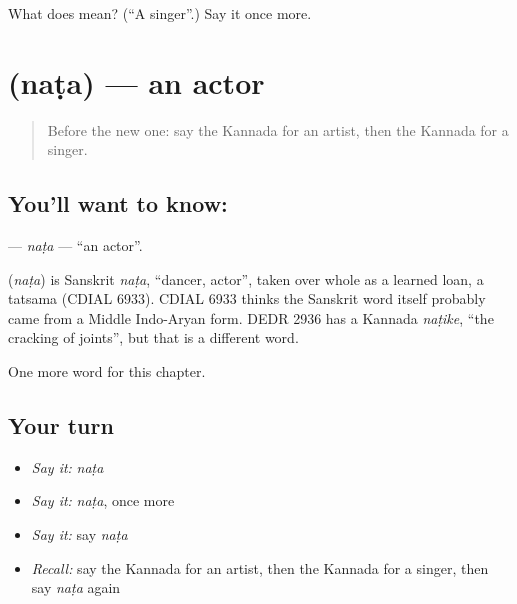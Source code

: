\begin{tcolorbox}[breakable,colback=teal!4,colframe=teal!35!black,title={Before you move on}]
What does  mean? (\textquotedblleft{}A singer\textquotedblright{}.) Say it once more.
\end{tcolorbox}
\section[\texorpdfstring{\kn{ನಟ} (naṭa)}{ನಟ (naṭa)}]{ (naṭa) — an actor}

\label{lesson:KA-C305-nata}



\begin{quote}
Before the new one: say the Kannada for an artist, then the Kannada for a singer.
\end{quote}

\subsection*{You'll want to know: }
\textbf{} — \emph{naṭa} — \textquotedblleft{}an actor\textquotedblright{}.

\begin{cousinweb}
\textbf{} (\emph{naṭa}) is Sanskrit \emph{naṭa}, \textquotedblleft{}dancer, actor\textquotedblright{}, taken over whole as a learned loan, a tatsama (CDIAL 6933). CDIAL 6933 thinks the Sanskrit word itself probably came from a Middle Indo-Aryan form. DEDR 2936 has a Kannada \emph{naṭike}, \textquotedblleft{}the cracking of joints\textquotedblright{}, but that is a different word.
\end{cousinweb}

\begin{grammarlens}[title={What you've built}]
One more word for this chapter.
\end{grammarlens}

\subsection*{Your turn}
\begin{itemize}
\raggedright
  \item \emph{Say it:} \emph{naṭa}
  \item \emph{Say it:} \emph{naṭa}, once more
  \item \emph{Say it:} say \emph{naṭa}
  \item \emph{Recall:} say the Kannada for an artist, then the Kannada for a singer, then say \emph{naṭa} again
\end{itemize}


